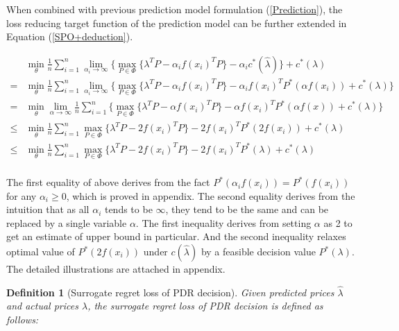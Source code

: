 \documentclass[journal]{IEEEtran}
\newtheorem{definition}{Definition}
\begin{document}
When combined with previous prediction model formulation (\ref{Prediction}), the loss reducing target function of the prediction model can be further extended in Equation (\ref{SPO+deduction}).
\begin{figure*}[!t]
  \begin{equation}
    \label{SPO+deduction}
    \begin{aligned}
      &\min_{\theta} \frac{1}{n} \sum_{i=1}^n \lim_{\alpha_i \to \infty } \Big\{ \max_{P \in \Phi} \{\lambda^T P - \alpha_i f(x_i)^T P \} - \alpha_i c^*(\hat{\lambda}) \Big\}  + c^*(\lambda) \\
      = & \min_{\theta} \frac{1}{n} \sum_{i=1}^n \lim_{\alpha_i \to \infty } \Big\{ \max_{P \in \Phi} \{\lambda^T P - \alpha_i f(x_i)^T P \} - \alpha_i f(x_i)^T P^*(\alpha f(x_i))  + c^*(\lambda) \Big\} \\
      = & \min_{\theta}  \lim_{\alpha \to \infty } \frac{1}{n} \sum_{i=1}^n \Big\{ \max_{P \in \Phi} \{\lambda^T P - \alpha f(x_i)^T P \} - \alpha f(x_i)^T P^*(\alpha f(x))  + c^*(\lambda) \Big\} \\
      \leq & \min_{\theta} \frac{1}{n} \sum_{i=1}^n   \max_{P \in \Phi} \Big\{\lambda^T P - 2 f(x_i)^T P \Big\} - 2 f(x_i)^T P^*(2 f(x_i)) + c^*(\lambda)\\
      \leq & \min_{\theta} \frac{1}{n} \sum_{i=1}^n   \max_{P \in \Phi} \Big\{\lambda^T P - 2 f(x_i)^T P \Big\} - 2 f(x_i)^T P^*(\lambda) + c^*(\lambda) \\ 
    \end{aligned}
  \end{equation}
\end{figure*}
The first equality of above derives from the fact $P^*(\alpha_i f(x_i)) = P^*(f(x_i))$ for any $\alpha_i \geq 0$, which is proved in appendix. The second equality derives from the intuition that as all $\alpha_i$ tends to be $\infty$, they tend to be the same and can be replaced by a single variable $\alpha$. The first inequality derives from setting $\alpha$ as 2 to get an estimate of upper bound in particular. And the second inequality relaxes optimal value of $P^*(2 f(x_i))$ under $c(\hat{\lambda})$  by a feasible decision value $P^*(\lambda)$. The detailed illustrations are attached in appendix.

\begin{definition}[Surrogate regret loss of PDR decision]
Given predicted prices $\hat{\lambda}$ and actual prices $\lambda$, the surrogate regret loss of PDR decision is defined as follows:
\end{definition}
\end{document}
